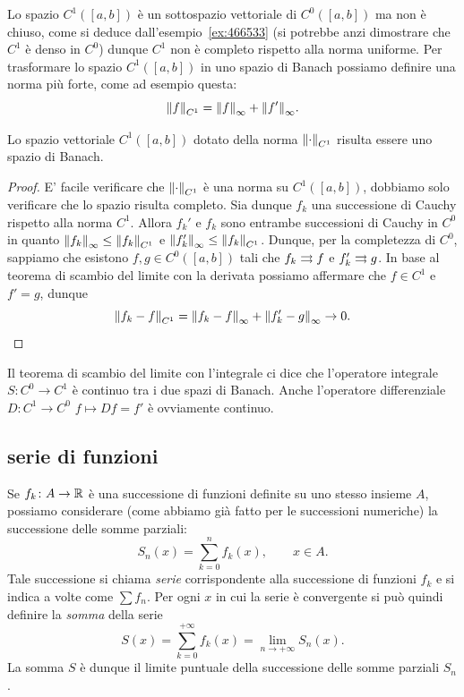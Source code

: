 Lo spazio $C^1([a,b])$ è un sottospazio vettoriale di $C^0([a,b])$ ma non è chiuso, come si deduce dall'esempio~\ref{ex:466533} (si potrebbe anzi dimostrare che $C^1$ è denso in $C^0$) dunque $C^1$ non è completo rispetto alla norma uniforme.
Per trasformare lo spazio $C^1([a,b])$ in uno spazio di Banach
possiamo definire una norma più forte, come ad esempio
questa:
\[
  {\left\Vert f\right\Vert}_{C^1} = {\left\Vert f\right\Vert}_\infty + {\left\Vert f'\right\Vert}_\infty.
\]
\begin{theorem}
\mymark{*}
Lo spazio vettoriale $C^1([a,b])$ dotato della norma ${\left\Vert \cdot\right\Vert}_{C^1}$ risulta essere uno spazio di Banach.
\end{theorem}
%
\begin{proof}
E' facile verificare che ${\left\Vert \cdot\right\Vert}_{C^1}$ è una norma su $C^1([a,b])$, dobbiamo solo verificare che lo spazio risulta completo. Sia dunque $f_k$ una successione di Cauchy rispetto alla norma $C^1$. Allora $f_k'$ e $f_k$ sono entrambe successioni di Cauchy in $C^0$ in quanto ${\left\Vert f_k\right\Vert}_\infty \le {\left\Vert f_k\right\Vert}_{C^1}$ e ${\left\Vert f_k'\right\Vert}_\infty \le {\left\Vert f_k\right\Vert}_{C^1}$.
Dunque, per la completezza di $C^0$, sappiamo che esistono $f,g\in C^0([a,b])$ tali che $f_k\rightrightarrows f$ e $f_k'\rightrightarrows g$.
In base al teorema di scambio del limite con la derivata possiamo affermare che $f\in C^1$ e $f'=g$, dunque
\[
  {\left\Vert f_k-f\right\Vert}_{C^1} = {\left\Vert f_k-f\right\Vert}_\infty + {\left\Vert f_k'-g\right\Vert}_\infty \to 0.
\]
\end{proof}

Il teorema di scambio del limite con l'integrale ci dice che
l'operatore integrale $S\colon C^0 \to C^1$ è continuo tra i due spazi di Banach. Anche l'operatore differenziale $D\colon C^1 \to C^0$ $f\mapsto Df = f'$ è ovviamente continuo.

\subsection{serie di funzioni}

Se $f_k\colon A \to {\mathbb R}$ è una successione di funzioni
definite su uno stesso insieme $A$, possiamo considerare (come abbiamo già fatto per le successioni numeriche) la successione delle somme parziali:
\[
  S_n(x) = \sum_{k=0}^n f_k(x), \qquad x\in A.
\]
Tale successione si chiama \emph{serie} corrispondente alla successione di funzioni $f_k$
e si indica a volte come $\sum f_n$. Per ogni $x$ in cui la serie è convergente si può quindi definire la
\emph{somma}%
 della serie
\[
  S(x) = \sum_{k=0}^{+\infty} f_k(x) = \lim_{n\to +\infty} S_n(x).
\]
La somma $S$ è dunque il limite puntuale della successione delle somme parziali $S_n$.

